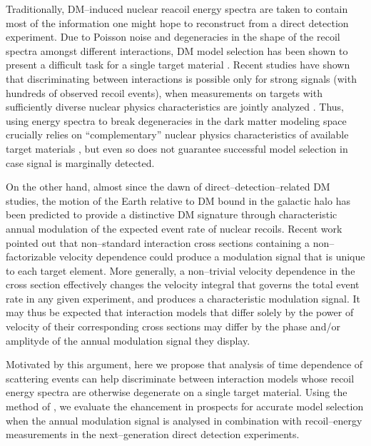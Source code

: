 \documentclass[11pt]{article}
\begin{document}
Traditionally, DM--induced nuclear reacoil energy spectra are taken to contain most of the information one might hope to reconstruct from a direct detection experiment. Due to Poisson noise and degeneracies in the shape of the recoil spectra amongst different interactions, DM model selection has been shown to present a difficult task for a single target material \cite{}. Recent studies have shown that discriminating between interactions is possible only for strong signals (with hundreds of observed recoil events), when measurements on targets with sufficiently diverse nuclear physics characteristics are jointly analyzed \cite{}. Thus, using energy spectra to break degeneracies in the dark matter modeling space crucially relies on ``complementary'' nuclear physics characteristics of available target materials \cite{McDermott:2011hx,Peter:2013aha,Gluscevic:2014vga,Catena:2014epa,Catena:2014hla,Dent:2015zpa,Gluscevic:2015sqa,Ruppin:2014bra}, but even so does not guarantee successful model selection in case signal is marginally detected.

On the other hand, almost since the dawn of direct--detection--related DM studies, the motion of the Earth relative to DM bound in the galactic halo has been predicted to provide a distinctive DM signature \cite{Freese:1987wu, Freese:2012xd,Lee:2013xxa,Britto:2014wga,DelNobile:2015nua,Kouvaris:2015xga} through characteristic annual modulation of the expected event rate of nuclear recoils. Recent work \cite{DelNobile:2015tza,DelNobile:2015rmp} pointed out that non--standard interaction cross sections containing a non--factorizable velocity dependence could produce a modulation signal that is unique to each target element. More generally, a non--trivial velocity dependence in the cross section effectively changes the velocity integral that governs the total event rate in any given experiment, and produces a characteristic modulation signal. It may thus be expected that interaction models that differ solely by the power of velocity of their corresponding cross sections may differ by the phase and/or amplityde of the annual modulation signal they display. 

Motivated by this argument, here we propose that analysis of time dependence of scattering events can help discriminate between interaction models whose recoil energy spectra are otherwise degenerate on a single target material. Using the method of \cite{}, we evaluate the ehancement in prospects for accurate model selection when the annual modulation signal is analysed in combination with recoil--energy measurements in the next--generation direct detection experiments. 
\end{document}
